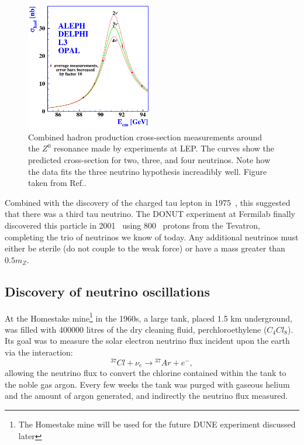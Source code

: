 \begin{figure} %
    \includegraphics[origin=c,width=0.5\textwidth]{diagrams/3-theory/z_resonance.png}
    \caption[z resonance short]
    {Combined hadron production cross-section measurements around the $Z^{0}$ resonance made by
        experiments at LEP. The curves show the predicted cross-section for two, three, and four
        neutrinos. Note how the data fits the three neutrino hypothesis increadibly well.
        Figure taken from Ref.\cite{electroweak2006}.}
    \label{fig:z_resonance}
\end{figure} %

Combined with the discovery of the charged tau lepton in 1975~\cite{perl1975}, this suggested that
there was a third tau neutrino. The DONUT experiment at Fermilab finally discovered this particle
in 2001~\cite{Kodama2001} using 800 \GeV ~protons from the Tevatron, completing the trio of
neutrinos we know of today. Any additional neutrinos must either be sterile (do not couple to the
weak force) or have a mass greater than $0.5m_{Z}$.

\subsection{Discovery of neutrino oscillations} %
\label{sec:theory_history_neutrinos}

At the Homestake mine\footnote{The Homestake mine will be used for the future DUNE experiment
    discussed later} in the 1960s, a large tank, placed 1.5 km underground, was filled with
400000 litres of the dry cleaning fluid, perchloroethylene ($C_{4}Cl_{8}$). Its goal was to
measure the solar electron neutrino flux incident upon the earth via the interaction:
\begin{equation} %
    {}^{37}Cl+\nu_{e}\rightarrow{}^{37}Ar+e^{-},
\end{equation} %
allowing the neutrino flux to convert the chlorine contained within the tank to the noble gas
argon. Every few weeks the tank was purged with gaseous helium and the amount of argon generated,
and indirectly the neutrino flux measured.

